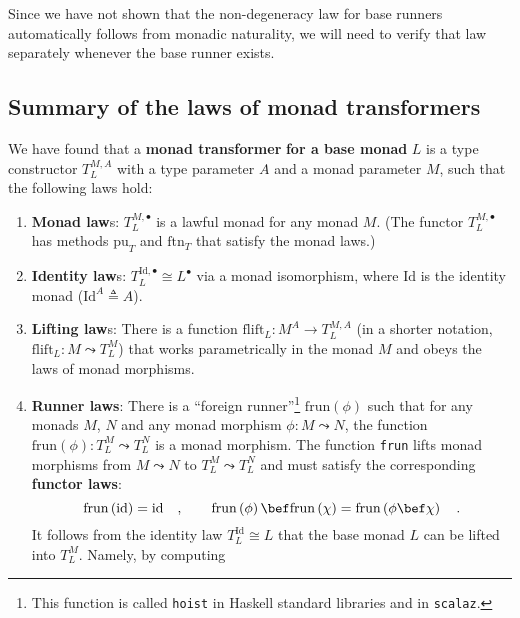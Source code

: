Since we have not shown that the non-degeneracy law for base runners
automatically follows from monadic naturality, we will need to verify
that law separately whenever the base runner exists.

\subsection{Summary of the laws of monad transformers\label{subsec:Laws-of-monad-transformers}}

We have found that a \textbf{monad transformer}
\textbf{for a base monad} $L$ is a type constructor $T_{L}^{M,A}$
with a type parameter $A$ and a monad parameter $M$, such that the
following laws hold:
\begin{enumerate}
\item \textbf{Monad law}s: $T_{L}^{M,\bullet}$ is a lawful monad for any
monad $M$. (The functor $T_{L}^{M,\bullet}$
has methods $\text{pu}_{T}$ and $\text{ftn}_{T}$ that satisfy the
monad laws.)
\item \textbf{Identity law}s: $T_{L}^{\text{Id},\bullet}\cong L^{\bullet}$
via a monad isomorphism, where $\text{Id}$ is the identity monad
($\text{Id}^{A}\triangleq A$).
\item \textbf{Lifting law}s: There
is a function $\text{flift}_{L}:M^{A}\rightarrow T_{L}^{M,A}$ (in
a shorter notation, $\text{flift}_{L}:M\leadsto T_{L}^{M}$) that
works parametrically in the monad $M$ and obeys the laws of monad
morphisms.
\item \textbf{Runner laws}: There
is a \textsf{``}foreign runner\textsf{''}\footnote{This function is called \lstinline!hoist! in Haskell standard libraries
and in \texttt{scalaz}.} $\text{frun}\left(\phi\right)$ such that for any monads $M$, $N$
and any monad morphism $\phi:M\leadsto N$, the function $\text{frun}\left(\phi\right):T_{L}^{M}\leadsto T_{L}^{N}$
is a monad morphism. The function \lstinline!frun! lifts monad morphisms
from $M\leadsto N$ to $T_{L}^{M}\leadsto T_{L}^{N}$ and must satisfy
the corresponding \textbf{functor laws}:
\[
\text{frun}\left(\text{id}\right)=\text{id}\quad,\quad\quad\text{frun}\left(\phi\right)\bef\text{frun}\left(\chi\right)=\text{frun}\left(\phi\bef\chi\right)\quad.
\]
It follows from the identity law $T_{L}^{\text{Id}}\cong L$ that
the base monad $L$ can be lifted into $T_{L}^{M}$. Namely, by computing

\end{enumerate}
